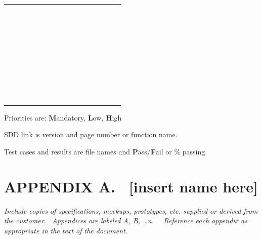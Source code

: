 \documentclass[twoside,letterpaper]{article}
\begin{document}
{\begin{flushleft}
\begin{supertabular}{m{0.9212598in}|m{0.42125985in}|m{1.9212599in}|m{0.39275986in}|m{0.7587598in}|m{0.6622598in}|m{0.5462598in}|m{0.6712598in}|m{0.6087598in}|m{0.6712598in}|m{0.6295598in}|}
~
 &
~
 &
~
 &
~
 &
~
 &
~
 &
~
 &
~
 &
~
\\\hhline{~----------}
 &
 &
~
 &
~
 &
~
 &
~
 &
~
 &
~
 &
~
 &
~
 &
~
\\\hhline{~----------}
 &
 &
~
 &
~
 &
~
 &
~
 &
~
 &
~
 &
~
 &
~
 &
~
\\\hhline{~----------}
 &
 &
~
 &
~
 &
~
 &
~
 &
~
 &
~
 &
~
 &
~
 &
~
\\\hline
{} &
 &
~
 &
~
 &
~
 &
~
 &
~
 &
~
 &
~
 &
~
 &
~
\\\hline
 &
 &
~
 &
~
 &
~
 &
~
 &
~
 &
~
 &
~
 &
~
 &
~
\\\hhline{~----------}
 &
 &
~
 &
~
 &
~
 &
~
 &
~
 &
~
 &
~
 &
~
 &
~
\\\hline
{} &
 &
~
 &
~
 &
~
 &
~
 &
~
 &
~
 &
~
 &
~
 &
~
\\\hline
\end{supertabular}
\end{flushleft}
{\color{black}
Priorities are: \textbf{M}andatory, \textbf{L}ow, \textbf{H}igh}

{\color{black}
SDD link is version and page number or function name.}

{\color{black}
Test cases and results are file names and \textbf{P}ass/\textbf{F}ail or \% passing.}

\clearpage\setcounter{page}{1}\pagestyle{Convertvii}
\section[APPENDIX A. \ [insert name here{]}]{\rmfamily\bfseries\color{black} APPENDIX A.
\ [insert name here]}
\hypertarget{RefHeading28659017292}{}
\bigskip

{\itshape\color{black}
Include copies of specifications, mockups, prototypes, etc. supplied or derived from the customer. \ Appendices are
labeled A, B, {\dots}n. \ \ Reference each appendix as appropriate in the text of the document. }

}
\end{document}
